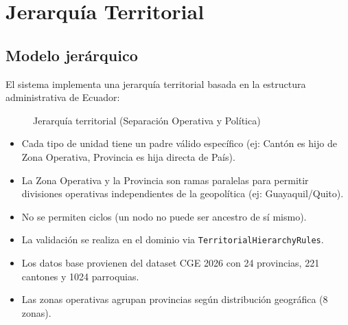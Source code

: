 \documentclass[11pt, a4paper]{article}
\begin{document}
\section{Jerarquía Territorial}

\subsection{Modelo jerárquico}

El sistema implementa una jerarquía territorial basada en la estructura administrativa de Ecuador:

\begin{figure}[H]
\centering
{}
\caption{Jerarquía territorial (Separación Operativa y Política)}
\end{figure}

\begin{restriccion}
\begin{itemize}
  \item Cada tipo de unidad tiene un padre válido específico (ej: Cantón es hijo de Zona Operativa, Provincia es hija directa de País).
  \item La Zona Operativa y la Provincia son ramas paralelas para permitir divisiones operativas independientes de la geopolítica (ej: Guayaquil/Quito).
  \item No se permiten ciclos (un nodo no puede ser ancestro de sí mismo).
  \item La validación se realiza en el dominio via \texttt{TerritorialHierarchyRules}.
  \item Los datos base provienen del dataset CGE 2026 con 24 provincias, 221 cantones y 1024 parroquias.
  \item Las zonas operativas agrupan provincias según distribución geográfica (8 zonas).
\end{itemize}
\end{restriccion}
\end{document}
